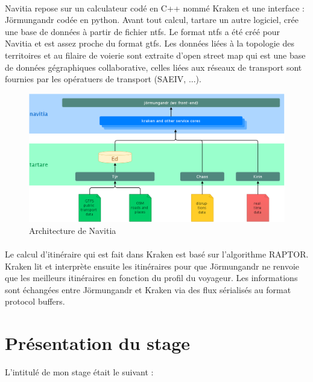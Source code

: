 \documentclass[a4paper]{report}
\begin{document}
\paragraph{}Navitia repose sur un calculateur codé en C++ nommé Kraken et une interface : Jörmungandr codée en python. Avant tout calcul, tartare un autre logiciel, crée une base de données à partir de fichier ntfs. Le format ntfs a été créé pour Navitia et est assez proche du format gtfs. Les données liées à la topologie des territoires et au filaire de voierie sont extraite d'open street map qui est une base de données gégraphiques collaborative, celles liées aux réseaux de transport sont fournies par les opératuers de transport (SAEIV, ...).

\begin{figure}[H]
	\begin{center}
		\includegraphics[width=400pt]{image/architecture_navitia}
		\caption{Architecture de Navitia}
		\label{Architecture de Navitia}
	\end{center}
\end{figure}

\paragraph{} Le calcul d'itinéraire qui est fait dans Kraken est basé sur l'algorithme RAPTOR. Kraken lit et interprète ensuite les itinéraires pour que Jörmungandr ne renvoie que les meilleurs itinéraires en fonction du profil du voyageur. Les informations sont échangées entre Jörmungandr et Kraken via des flux sérialisés au format protocol buffers.

\section{Présentation du stage}

L'intitulé de mon stage était le suivant :
\end{document}
